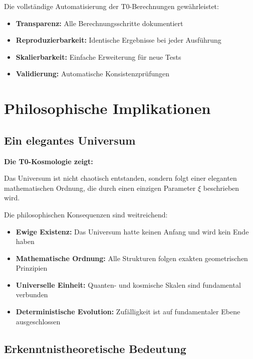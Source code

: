 \documentclass[12pt,a4paper]{article}
\newcommand{\xipar}{\xi}
\begin{document}
	Die vollständige Automatisierung der T0-Berechnungen gewährleistet:
	
	\begin{itemize}
		\item \textbf{Transparenz:} Alle Berechnungsschritte dokumentiert
		\item \textbf{Reproduzierbarkeit:} Identische Ergebnisse bei jeder Ausführung
		\item \textbf{Skalierbarkeit:} Einfache Erweiterung für neue Tests
		\item \textbf{Validierung:} Automatische Konsistenzprüfungen
	\end{itemize}
	
	\section{Philosophische Implikationen}
	
	\subsection{Ein elegantes Universum}
	
	\begin{revolutionary}
		\textbf{Die T0-Kosmologie zeigt:}
		
		Das Universum ist nicht chaotisch entstanden, sondern folgt einer eleganten mathematischen Ordnung, die durch einen einzigen Parameter $\xipar$ beschrieben wird.
	\end{revolutionary}
	
	Die philosophischen Konsequenzen sind weitreichend:
	
	\begin{itemize}
		\item \textbf{Ewige Existenz:} Das Universum hatte keinen Anfang und wird kein Ende haben
		\item \textbf{Mathematische Ordnung:} Alle Strukturen folgen exakten geometrischen Prinzipien
		\item \textbf{Universelle Einheit:} Quanten- und kosmische Skalen sind fundamental verbunden
		\item \textbf{Deterministische Evolution:} Zufälligkeit ist auf fundamentaler Ebene ausgeschlossen
	\end{itemize}
	
	\subsection{Erkenntnistheoretische Bedeutung}
	
\end{document}
